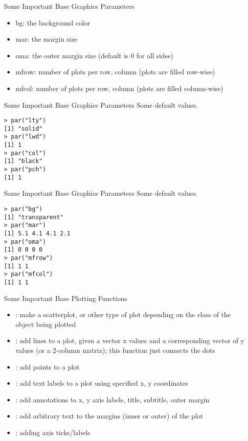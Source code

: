 \documentclass[aspectratio=169]{beamer}
\begin{document}
\begin{frame}{Some Important Base Graphics Parameters}
\begin{itemize}
\item
bg: the background color
\item
mar:  the margin size
\item
oma:  the outer margin size (default is 0 for all sides)
\item
mfrow: number of plots per row, column (plots are filled row-wise)
\item
mfcol: number of plots per row, column (plots are filled column-wise)
\end{itemize}
\end{frame}

\begin{frame}[fragile]{Some Important Base Graphics Parameters}
Some default values.
\begin{verbatim}
> par("lty")
[1] "solid"
> par("lwd")
[1] 1
> par("col")
[1] "black"
> par("pch")
[1] 1
\end{verbatim}
\end{frame}

\begin{frame}[fragile]{Some Important Base Graphics Parameters}
Some default values.
\begin{verbatim}
> par("bg")
[1] "transparent"
> par("mar")
[1] 5.1 4.1 4.1 2.1
> par("oma")
[1] 0 0 0 0
> par("mfrow")
[1] 1 1
> par("mfcol")
[1] 1 1
\end{verbatim}
\end{frame}

\begin{frame}{Some Important Base Plotting Functions}
\begin{itemize}
\item
{}: make a scatterplot, or other type of plot depending on
the class of the object being plotted
\item
{}: add lines to a plot, given a vector x values and a
corresponding vector of y values (or a 2-column matrix); this function
just connects the dots
\item
{}: add points to a plot
\item
{}: add text labels to a plot using specified x, y
coordinates
\item
{}: add annotations to x, y axis labels, title, subtitle,
outer margin
\item
{}: add arbitrary text to the margins (inner or outer) of
the plot
\item
{}: adding axis ticks/labels
\end{itemize}
\end{frame}
\end{document}
